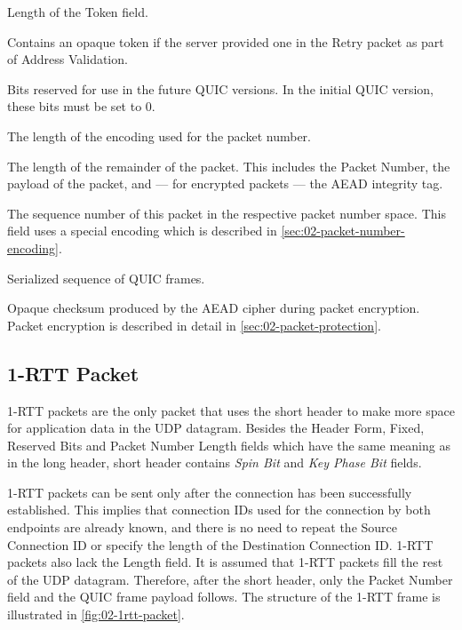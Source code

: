 \begin{description}

     Length of the Token field.

     Contains an opaque token if the server provided
    one in the Retry packet as part of Address Validation.

     Bits reserved for use in the future QUIC versions. In the initial QUIC
    version, these bits must be set to 0.

     The length of the encoding used for the packet number.

     The length of the remainder of the packet. This includes the Packet Number,
    the payload of the packet, and --- for encrypted packets --- the AEAD integrity tag.

     The sequence number of this packet in the respective packet number space.
    This field uses a special encoding which is described in \autoref{sec:02-packet-number-encoding}.

     Serialized sequence of QUIC frames.

     Opaque checksum produced by the AEAD cipher during packet encryption.
    Packet encryption is described in detail in \autoref{sec:02-packet-protection}.

\end{description}

\subsection{1-RTT Packet}

1-RTT packets are the only packet that uses the short header to make more space for application data
in the UDP datagram. Besides the Header Form, Fixed, Reserved Bits and Packet Number Length fields
which have the same meaning as in the long header, short header contains \textit{Spin Bit} and
\textit{Key Phase Bit} fields.

1-RTT packets can be sent only after the connection has been successfully established. This implies
that connection IDs used for the connection by both endpoints are already known, and there is no
need to repeat the Source Connection ID or specify the length of the Destination Connection ID.
1-RTT packets also lack the Length field. It is assumed that 1-RTT packets fill the rest of the UDP
datagram. Therefore, after the short header, only the Packet Number field and the QUIC frame payload
follows. The structure of the 1-RTT frame is illustrated in \autoref{fig:02-1rtt-packet}.

